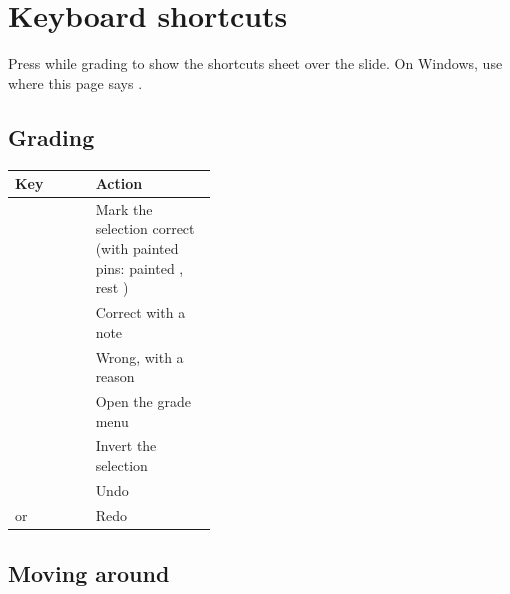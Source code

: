 \section{Keyboard shortcuts}\label{sec:shortcuts}
\tocoff

\label{sec:shortcuts:keyboard-shortcuts}

Press  while grading to show the shortcuts sheet over the slide. On Windows, use  where this page says \keycap{\cmdsym{}}.


\begin{multicols}{2}
\subsection{Grading}\label{sec:shortcuts:grading}

\begingroup\renewcommand{\arraystretch}{1.35}
\noindent\begin{tabularx}{\linewidth}{>{\raggedright\arraybackslash}p{0.4\linewidth}Y}
\toprule
\textbf{Key} & \textbf{Action} \\
\midrule
{} & Mark the selection correct (with painted pins: painted \checksym{}, rest \crosssym{}) \\
\keycap{\shiftsym{}}\keyplus{} & Correct with a note \\
 & Wrong, with a reason \\
\keycap{\returnsym{}} & Open the grade menu \\
 & Invert the selection \\
\keycap{\cmdsym{}}\keyplus{} & Undo \\
\keycap{\shiftsym{}}\keyplus{}\keycap{\cmdsym{}}\keyplus{} or \keycap{\cmdsym{}}\keyplus{} & Redo \\
\bottomrule
\end{tabularx}\endgroup\par\medskip

\subsection{Moving around}\label{sec:shortcuts:moving-around}


\end{multicols}
